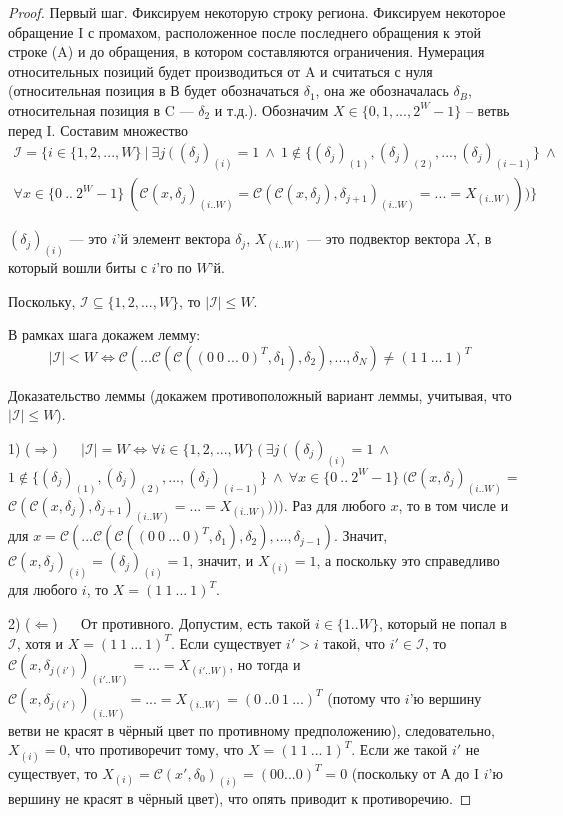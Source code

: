 \begin{proof}
  Первый шаг. Фиксируем некоторую строку региона. Фиксируем некоторое обращение I с промахом, расположенное после последнего обращения к этой строке (A) и до обращения, в котором составляются ограничения. Нумерация относительных позиций будет производиться от A и считаться с нуля (относительная позиция в В будет обозначаться $\delta_1$, она же обозначалась $\delta_B$, относительная позиция в C --- $\delta_2$ и т.д.). Обозначим $X \in \{0, 1, ..., 2^W-1\}$ -- ветвь перед I. Составим множество
  $$\begin{array}{c}\mathcal{I} = \{i \in \{1, 2, ..., W\} ~|~ \exists j ~(~ (\delta_j)_{(i)} = 1 ~\wedge~
   1 \notin \{ (\delta_j)_{(1)}, (\delta_j)_{(2)}, ..., (\delta_j)_{(i-1)} \} ~\wedge~\\
   \forall x \in \{0~..~2^W{-}1\}~(  \mathcal{C}(x, \delta_j)_{(i..W)} = \mathcal{C}(\mathcal{C}(x, \delta_j), \delta_{j+1})_{(i..W)} = ... = X_{(i..W)}) ) \}\end{array}$$

   $(\delta_j)_{(i)}$ --- это $i$'й элемент вектора $\delta_j$, $X_{(i..W)}$ --- это подвектор вектора $X$, в который вошли биты с $i$'го по $W$'й.

   Поскольку, $\mathcal{I} \subseteq \{1, 2, ..., W\}$, то $|\mathcal{I}| \leqslant W$.

   В рамках шага докажем лемму: $$|\mathcal{I}| < W \Leftrightarrow \mathcal{C}( ...  \mathcal{C}(  \mathcal{C}( (0~0~...~0)^T, \delta_1), \delta_2), ..., \delta_N) \neq (1~1~...~1)^T$$

   Доказательство леммы (докажем противоположный вариант леммы, учитывая, что $|\mathcal{I}| \leqslant W$).

   1) ($\Rightarrow$) ~~ $|\mathcal{I}| = W \Leftrightarrow \forall i \in \{1, 2, ..., W\} ~(~ \exists j ~(~ (\delta_j)_{(i)} = 1 ~\wedge~$ \\ $1 \notin \{ (\delta_j)_{(1)}, (\delta_j)_{(2)}, ..., (\delta_j)_{(i-1)} \} ~\wedge~
   \forall x \in \{0~..~2^W{-}1\}~(  \mathcal{C}(x, \delta_j)_{(i..W)} =$\\
    $\mathcal{C}(\mathcal{C}(x, \delta_j), \delta_{j+1})_{(i..W)} = ... = X_{(i..W)}) ) )$. Раз для любого $x$, то в том числе и для $x = \mathcal{C}( ...  \mathcal{C}(  \mathcal{C}( (0~0~...~0)^T, \delta_1), \delta_2), ..., \delta_{j-1})$. Значит, $\mathcal{C}(x, \delta_j)_{(i)} = (\delta_j)_{(i)} = 1$, значит, и $X_{(i)} = 1$, а поскольку это справедливо для любого $i$, то $X = (1~1~...~1)^T$.

   2) ($\Leftarrow$) ~~  От противного. Допустим, есть такой $i \in \{1..W\}$, который не попал в $\mathcal{I}$, хотя и $X = (1~1~...~1)^T$. Если существует $i' > i$ такой, что $i' \in \mathcal{I}$, то $\mathcal{C}(x, \delta_{j(i')})_{(i'..W)} = ... = X_{(i'..W)}$, но тогда и  $\mathcal{C}(x, \delta_{j(i')})_{(i..W)} = ... = X_{(i..W)} = (0~..0~1~...)^T$ (потому что $i$'ю вершину ветви не красят в чёрный цвет по противному предположению), следовательно, $X_{(i)} = 0$, что противоречит тому, что $X = (1~1~...~1)^T$. Если же такой $i'$ не существует, то $X_{(i)} = \mathcal{C}(x', \delta_0)_{(i)} = (0 0 ... 0)^T = 0$ (поскольку от А до I $i$'ю вершину не красят в чёрный цвет), что опять приводит к противоречию.


\end{proof}
